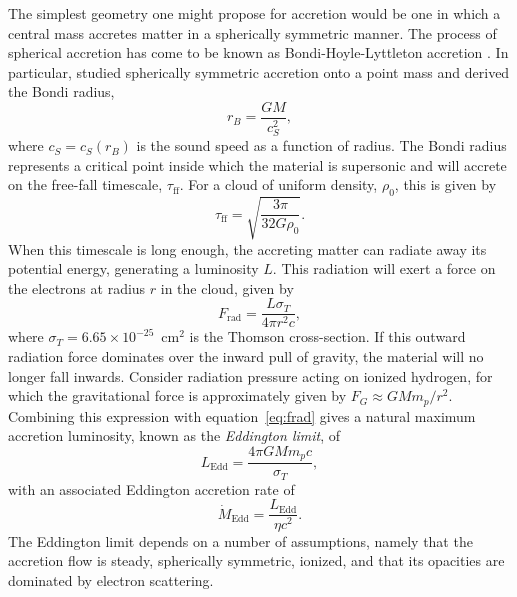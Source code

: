 The simplest geometry one might propose for accretion
would be one in which a central mass accretes matter in a spherically
symmetric manner. 
The process of spherical accretion has come to be known as 
Bondi-Hoyle-Lyttleton accretion \citep{hoyle1939,bondi1944}.
In particular, \cite{bondi1952} studied spherically symmetric 
accretion onto a point mass and derived the Bondi radius,
\begin{equation}
r_B = \frac{G M}{c_S^2},
\label{eq:bondi}
\end{equation} 
where $c_S = c_S(r_B)$ is the sound speed as a function of radius.
The Bondi radius represents a critical point inside which the material
is supersonic and will accrete on the free-fall timescale, $\tau_{\mathrm{ff}}$.
For a cloud of uniform density, $\rho_0$, this is given by
\begin{equation}
\tau_{\mathrm{ff}} = \sqrt{\frac{3 \pi}{32 G \rho_0}}.
\label{eq:frad}
\end{equation} 
When this timescale is long enough, the accreting matter
can radiate away its potential energy, generating a luminosity $L$. 
This radiation will exert a force on the electrons at radius $r$ in the cloud, 
given by
\begin{equation}
F_{\mathrm{rad}} = \frac{L \sigma_T}{4 \pi r^2 c},
\label{eq:frad}
\end{equation} 
where $\sigma_T = 6.65\times10^{-25}$~cm$^2$ is the Thomson cross-section.
If this outward radiation force dominates over the inward pull of gravity, 
the material will no longer fall inwards. Consider
radiation pressure acting on ionized hydrogen, for which the gravitational
force is approximately given by $F_G \approx G M m_p / r^2$. Combining this expression
with equation~\ref{eq:frad} gives a natural
maximum accretion luminosity, known as the {\em Eddington limit}, of
\begin{equation}
L_{\mathrm{Edd}} = \frac{4 \pi G M m_p c}{\sigma_T},
\label{eq:bondi}
\end{equation} 
with an associated Eddington accretion rate of 
\begin{equation}
\dot{M}_{\mathrm{Edd}} = \frac{L_{\mathrm{Edd}}}{\eta c^2}.
\label{eq:bondi}
\end{equation} 
The Eddington limit depends on a number of assumptions, namely
that the accretion flow is steady, spherically symmetric, ionized,
and that its opacities are dominated by electron scattering.
